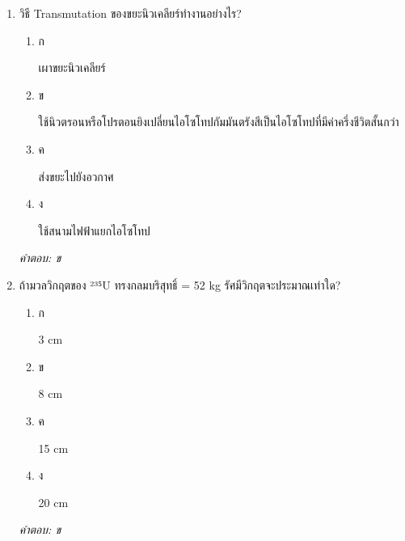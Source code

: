 \documentclass[12pt]{article}
\begin{document}
\begin{enumerate}[label=\arabic*., itemsep=0.5\baselineskip, topsep=0.5\baselineskip, leftmargin=*]
\item วิธี Transmutation ของขยะนิวเคลียร์ทำงานอย่างไร?
\begin{enumerate}[label=\alph*)., itemsep=0.3\baselineskip, topsep=0.3\baselineskip]
\item ก\ 
\begin{minipage}[t]{0.9\linewidth}
\raggedright เผาขยะนิวเคลียร์
\end{minipage}
\item ข\ 
\begin{minipage}[t]{0.9\linewidth}
\raggedright ใช้นิวตรอนหรือโปรตอนยิงเปลี่ยนไอโซโทปกัมมันตรังสีเป็นไอโซโทปที่มีค่าครึ่งชีวิตสั้นกว่า
\end{minipage}
\item ค\ 
\begin{minipage}[t]{0.9\linewidth}
\raggedright ส่งขยะไปยังอวกาศ
\end{minipage}
\item ง\ 
\begin{minipage}[t]{0.9\linewidth}
\raggedright ใช้สนามไฟฟ้าแยกไอโซโทป
\end{minipage}
\end{enumerate}
\vspace{-0.3\baselineskip}
\begin{small}
\textit{คำตอบ: ข}
\end{small}

\item ถ้ามวลวิกฤตของ ²³⁵U ทรงกลมบริสุทธิ์ = 52 kg รัศมีวิกฤตจะประมาณเท่าใด?
\begin{enumerate}[label=\alph*)., itemsep=0.3\baselineskip, topsep=0.3\baselineskip]
\item ก\ 
\begin{minipage}[t]{0.9\linewidth}
\raggedright 3 cm
\end{minipage}
\item ข\ 
\begin{minipage}[t]{0.9\linewidth}
\raggedright 8 cm
\end{minipage}
\item ค\ 
\begin{minipage}[t]{0.9\linewidth}
\raggedright 15 cm
\end{minipage}
\item ง\ 
\begin{minipage}[t]{0.9\linewidth}
\raggedright 20 cm
\end{minipage}
\end{enumerate}
\vspace{-0.3\baselineskip}
\begin{small}
\textit{คำตอบ: ข}
\end{small}


\end{enumerate}
\end{document}
